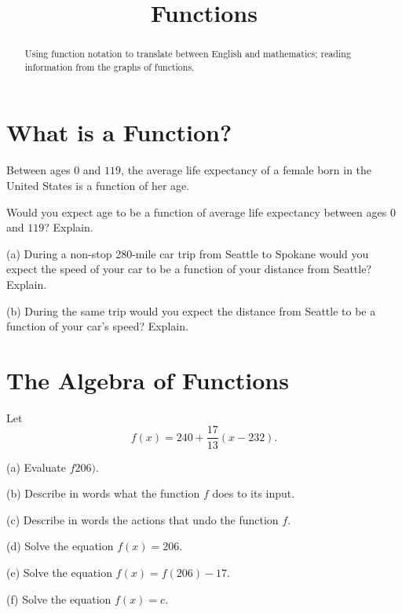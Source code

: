 \documentclass{ximera}
\title{Functions}
\begin{document}
\begin{abstract}
Using function notation to translate between English and mathematics; reading information from the graphs of functions.
\end{abstract}
\maketitle

\section{What is a Function?}

\begin{question} \label{Qdfewrr5hgyh}
Between ages $0$ and $119$, the average life expectancy of a female born in the United States is a function of her age.

Would you expect age to be a function of average life expectancy between ages $0$ and $119$? Explain.
 
\end{question}

\begin{question}  \label{Qdf4rr3gg}
(a) During a non-stop 280-mile car trip from Seattle to Spokane would you expect the speed of your car to be a function of your distance from Seattle? Explain.

(b) During the same trip would you expect the distance from Seattle to be a function of your car's speed? Explain.
\end{question}



\section{The Algebra of Functions}

\begin{question} \label{Q38742433}
Let 
\[
     f(x) = 240 + \frac{17}{13}(x-232).
\]

(a) Evaluate $f206)$.

(b) Describe in words what the function $f$ does to its input.

(c) Describe in words the actions that undo the function $f$.

(d) Solve the equation $f(x) = 206$.

(e) Solve the equation $f(x)=f(206) - 17$.

(f) Solve the equation $f(x)=c$.

\end{question}
\end{document}

